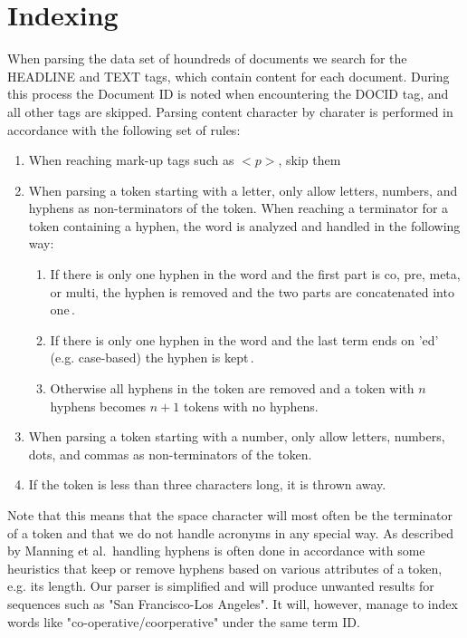 
\section{Indexing}
\label{sec:indexing}
When parsing the data set of houndreds of documents we search for the HEADLINE and TEXT tags, which contain content for each document. During this process the Document ID is noted when encountering the DOCID tag, and all other tags are skipped. Parsing content character by charater is performed in accordance with the following set of rules:

\begin{enumerate}
	\item When reaching mark-up tags such as $<p>$, skip them
	\item When parsing a token starting with a letter, only allow letters, numbers, and hyphens as non-terminators of the token. When reaching a terminator for a token containing a hyphen, the word is analyzed and handled in the following way:
	\begin{enumerate}
		\item If there is only one hyphen in the word and the first part is co, pre, meta, or multi, the hyphen is removed and the two parts are concatenated into one\,\cite{ibm13}.
		\item If there is only one hyphen in the word and the last term ends on 'ed' (e.g. case-based) the hyphen is kept\,\cite{ibm13}.
		\item Otherwise all hyphens in the token are removed and a token with $n$ hyphens becomes $n+1$ tokens with no hyphens.
	\end{enumerate}
	\item When parsing a token starting with a number, only allow letters, numbers, dots, and commas as non-terminators of the token.
	\item If the token is less than three characters long, it is thrown away.
\end{enumerate}

Note that this means that the space character will most often be the terminator of a token and that we do not handle acronyms in any special way. As described by Manning et al.\,\cite[p. 24]{manning2008introduction} handling hyphens is often done in accordance with some heuristics that keep or remove hyphens based on various attributes of a token, e.g. its length. Our parser is simplified and will produce unwanted results for sequences such as "San Francisco-Los Angeles". It will, however, manage to index words like "co-operative/coorperative" under the same term ID.

